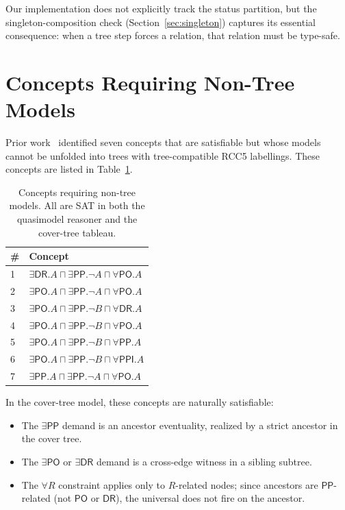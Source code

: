 \documentclass[a4paper,11pt]{article}
\theoremstyle{definition}
\newcommand{\DR}{\ensuremath{\mathsf{DR}}}
\newcommand{\PO}{\ensuremath{\mathsf{PO}}}
\newcommand{\PP}{\ensuremath{\mathsf{PP}}}
\newcommand{\PPI}{\ensuremath{\mathsf{PPI}}}
\begin{document}
Our implementation does not explicitly track the status partition,
but the singleton-composition check (Section~\ref{sec:singleton})
captures its essential consequence: when a tree step forces a
relation, that relation must be type-safe.


\section{Concepts Requiring Non-Tree Models}
\label{sec:cyclic}

Prior work~\cite{ClaudeDecidability} identified seven concepts
that are satisfiable but whose models cannot be unfolded into
trees with tree-compatible RCC5 labellings.
These concepts are listed in Table~\ref{tab:cyclic}.

\begin{table}[ht]
\centering
\caption{Concepts requiring non-tree models.
  All are SAT in both the quasimodel reasoner and the
  cover-tree tableau.}
\label{tab:cyclic}
\renewcommand{\arraystretch}{1.2}
\begin{tabular}{ll}
\toprule
\# & Concept \\
\midrule
1 & $\exists\DR.A \sqcap \exists\PP.\neg A \sqcap \forall\PO.A$ \\
2 & $\exists\PO.A \sqcap \exists\PP.\neg A \sqcap \forall\PO.A$ \\
3 & $\exists\PO.A \sqcap \exists\PP.\neg B \sqcap \forall\DR.A$ \\
4 & $\exists\PO.A \sqcap \exists\PP.\neg B \sqcap \forall\PO.A$ \\
5 & $\exists\PO.A \sqcap \exists\PP.\neg B \sqcap \forall\PP.A$ \\
6 & $\exists\PO.A \sqcap \exists\PP.\neg B \sqcap \forall\PPI.A$ \\
7 & $\exists\PP.A \sqcap \exists\PP.\neg A \sqcap \forall\PO.A$ \\
\bottomrule
\end{tabular}
\end{table}

In the cover-tree model, these concepts are naturally satisfiable:
\begin{itemize}[nosep]
  \item The $\exists\PP$ demand is an ancestor eventuality, realized
    by a strict ancestor in the cover tree.
  \item The $\exists\PO$ or $\exists\DR$ demand is a cross-edge
    witness in a sibling subtree.
  \item The $\forall R$ constraint applies only to $R$-related
    nodes; since ancestors are $\PP$-related (not $\PO$ or $\DR$),
    the universal does not fire on the ancestor.
\end{itemize}
\end{document}
